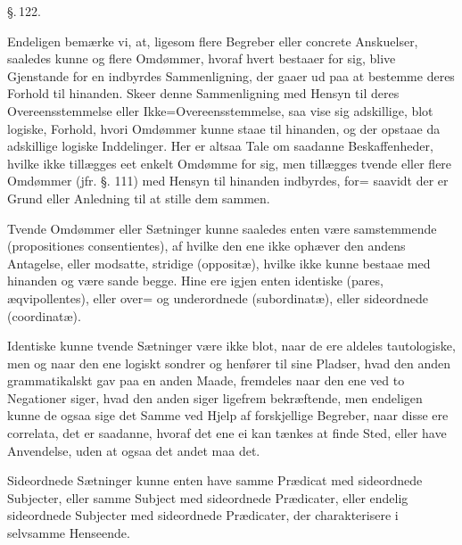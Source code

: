 \documentclass[12pt]{book}
\def\textit#1{#1}%
\def\emph#1{#1}%
\newcommand{\parag}[1]{%
  \par\vspace{0.9\baselineskip}%
  {\centering\textit{\S.\,#1.}\par}%
  \vspace{0.35\baselineskip}%
  \noindent\hspace{\parindent}\ignorespaces
}
\newcommand{\opage}[1]{\marginnote{\footnotesize\textit{[#1]}}}
\begin{document}
\parag{122}

Endeligen bemærke vi, at, ligesom flere Begreber eller \textit{concrete}
Anskuelser, saaledes kunne og flere Omdømmer, hvoraf hvert bestaaer for sig,
blive Gjenstande for en indbyrdes Sammenligning, der gaaer ud paa at bestemme
deres Forhold til hinanden. Skeer denne Sammenligning med Hensyn til deres
Overeensstemmelse eller Ikke=Overeensstemmelse, saa vise sig adskillige, blot
logiske, Forhold, hvori Omdømmer kunne staae til hinanden, og der opstaae da
adskillige logiske Inddelinger. Her er altsaa Tale om saadanne Beskaffenheder,
hvilke ikke tillægges eet enkelt Omdømme for sig, men tillægges tvende eller
flere Omdømmer (jfr. §. 111) med Hensyn til hinanden indbyrdes, for=%
\opage{296} saavidt der er Grund eller Anledning til at stille dem sammen.

Tvende Omdømmer eller Sætninger kunne saaledes enten være
\emph{samstemmende} (\textit{propositiones consentientes}), af hvilke den ene
ikke ophæver den andens Antagelse, eller \emph{modsatte}, \emph{stridige}
(\textit{oppositæ}), hvilke ikke kunne bestaae med hinanden og være sande
begge. Hine ere igjen enten \emph{identiske} (\textit{pares, æqvipollentes}),
eller \emph{over= og underordnede} (\textit{subordinatæ}), eller
\emph{sideordnede} (\textit{coordinatæ}).

\emph{Identiske} kunne tvende Sætninger være ikke blot, naar de ere aldeles
tautologiske, men og naar den ene logiskt sondrer og henfører til sine Pladser,
hvad den anden grammatikalskt gav paa en anden Maade, fremdeles naar den ene
ved to Negationer siger, hvad den anden siger ligefrem bekræftende, men
endeligen kunne de ogsaa sige det Samme ved Hjelp af forskjellige Begreber,
naar disse ere \textit{correlata}, det er saadanne, hvoraf det ene ei kan
tænkes at finde Sted, eller have Anvendelse, uden at ogsaa det andet maa det.

\emph{Sideordnede} Sætninger kunne enten have samme Prædicat med sideordnede
Subjecter, eller samme Subject med sideordnede Prædicater, eller endelig
sideordnede Subjecter med sideordnede Prædicater, der charakterisere i
selvsamme Henseende.
\end{document}
